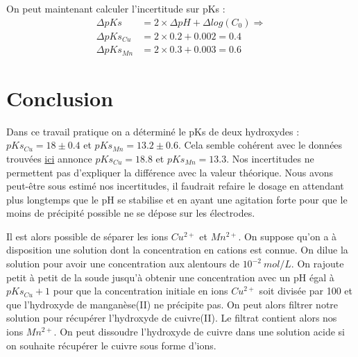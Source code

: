 \documentclass[12pt]{article}
\begin{document}
On peut maintenant calculer l'incertitude sur pKs :
\begin{align*}
\Delta pKs&= 2\times \Delta pH + \Delta log(C_0) \Longrightarrow\\
\Delta pKs_{Cu}&= 2 \times 0.2 + 0.002= 0.4 \\
\Delta pKs_{Mn}&= 2 \times 0.3 + 0.003 = 0.6
\end{align*}

\newpage
\section*{Conclusion}
Dans ce travail pratique on a déterminé le pKs de deux hydroxydes : $pKs_{Cu}=18\pm 0.4$ et $pKs_{Mn}=13.2\pm 0.6$. Cela semble cohérent avec le données trouvées \href{https://owl.oit.umass.edu/departments/Chemistry/appendix/ksp.html}{ici} annonce $pKs_{Cu}=18.8$ et $pKs_{Mn}=13.3$.
 Nos incertitudes ne permettent pas d'expliquer la différence avec la valeur théorique. Nous avons peut-être sous estimé nos incertitudes, il faudrait refaire le dosage en attendant plus longtemps que le pH se stabilise et en ayant une agitation forte pour que le moins de précipité possible ne se dépose sur les électrodes. 
 
Il est alors possible de séparer les ions $Cu^{2+}$ et $Mn^{2+}$. On suppose qu'on a à disposition une solution dont la concentration en cations est connue. On dilue la solution pour avoir une concentration aux alentours de $10^{-2} \ mol/L$. On rajoute petit à petit de la soude jusqu'à obtenir une concentration avec un pH égal à $pKs_{Cu}+1$ pour que la concentration initiale en ions $Cu^{2+}$ soit divisée par 100 et que l'hydroxyde de manganèse(II) ne précipite pas. On peut alors filtrer notre solution pour récupérer l'hydroxyde de cuivre(II). Le filtrat contient alors nos ions $Mn^{2+}$. On peut dissoudre l'hydroxyde de cuivre dans une solution acide si on souhaite récupérer le cuivre sous forme d'ions. 
\end{document}
